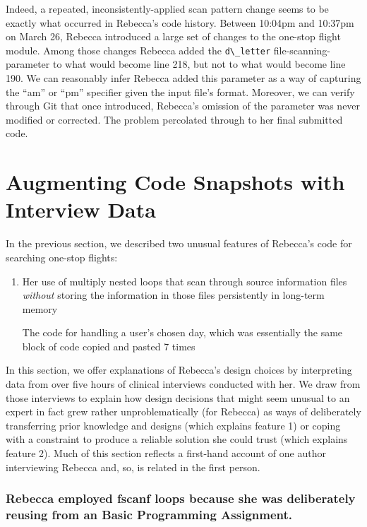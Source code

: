 Indeed, a repeated, inconsistently-applied scan pattern change seems to be exactly what occurred in Rebecca's code history. Between 10:04pm and 10:37pm on March 26, Rebecca introduced a large set of changes to the one-stop flight module. Among those changes Rebecca added the \texttt{d\textbackslash{}\_letter} file-scanning-parameter to what would become line 218, but not to what would become line 190. We can reasonably infer Rebecca added this parameter as a way of capturing the ``am'' or ``pm'' specifier given the input file's format. Moreover, we can verify through Git that once introduced, Rebecca's omission of the parameter was never modified or corrected. The problem percolated through to her final submitted code.

\section{Augmenting Code Snapshots with Interview Data}\label{analysis-augmenting-code-snapshots-with-interview-data}

In the previous section, we described two unusual features of Rebecca's code for searching one-stop flights:

\begin{enumerate}
\def\labelenumi{\arabic{enumi}.}
\item
  Her use of multiply nested loops that scan through source information files \emph{without} storing the information in those files persistently in long-term memory

  The code for handling a user's chosen day, which was essentially the same block of code copied and pasted 7 times
\end{enumerate}

In this section, we offer explanations of Rebecca's design choices by interpreting data from over five hours of clinical interviews conducted with her. We draw from those interviews to explain how design decisions that might seem unusual to an expert in fact grew rather unproblematically (for Rebecca) as ways of deliberately transferring prior knowledge and designs (which explains feature 1) or coping with a constraint to produce a reliable solution she could trust (which explains feature 2). Much of this section reflects a first-hand account of one author interviewing Rebecca and, so, is related in the first person.

\subsubsection{Rebecca employed fscanf loops because she was deliberately reusing from an Basic Programming Assignment.}\label{rebecca-employed-fscanf-loops-because-she-was-deliberately-reusing-from-an-basic-programming-assignment.}


